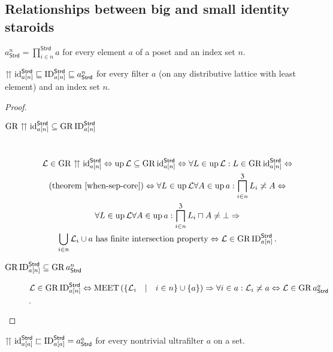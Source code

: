 \subsection{Relationships between big and small identity staroids}
\begin{defn}
$a_{\mathsf{Strd}}^{n}=\prod_{i\in n}^{\mathsf{Strd}}a$ for every
element $a$ of a poset and an index set $n$.\end{defn}
\begin{prop}
$\upuparrows\operatorname{id}_{a[n]}^{\mathsf{Strd}}\sqsubseteq\operatorname{ID}_{a[n]}^{\mathsf{Strd}}\sqsubseteq a_{\mathsf{Strd}}^{n}$
for every filter $a$ (on any distributive lattice with least element) and an index set
$n$.\end{prop}
\begin{proof}
~
\begin{description}
\item [{$\operatorname{GR}\upuparrows\operatorname{id}_{a[n]}^{\mathsf{Strd}}\subseteq\operatorname{GR}\operatorname{ID}_{a[n]}^{\mathsf{Strd}}$}] ~
\begin{multline*}
\mathcal{L}\in\operatorname{GR}\upuparrows\operatorname{id}_{a[n]}^{\mathsf{Strd}}\Leftrightarrow\operatorname{up}\mathcal{L}\subseteq\operatorname{GR}\operatorname{id}_{a[n]}^{\mathsf{Strd}}\Leftrightarrow\forall L\in\operatorname{up}\mathcal{L}:L\in\operatorname{GR}\operatorname{id}_{a[n]}^{\mathsf{Strd}}\Leftrightarrow\\
\text{(theorem~\ref{when-sep-core})}\Leftrightarrow\forall L\in\operatorname{up}\mathcal{L}\forall A\in\operatorname{up} a:\bigsqcap_{i\in n}^{\mathfrak{Z}}L_{i}\not\asymp A\Leftrightarrow\\
\forall L\in\operatorname{up}\mathcal{L}\forall A\in\operatorname{up} a:\bigsqcap_{i\in n}^{\mathfrak{Z}}L_{i}\sqcap A\neq\bot\Rightarrow\\
\bigcup_{i\in n}\mathcal{L}_{i}\cup a\text{ has finite intersection property}\Leftrightarrow\mathcal{L}\in\operatorname{GR}\operatorname{ID}_{a[n]}^{\mathsf{Strd}}.
\end{multline*}

\item [{$\operatorname{GR}\operatorname{ID}_{a[n]}^{\mathsf{Strd}}\subseteq\operatorname{GR} a_{\mathsf{Strd}}^{n}$}] $\mathcal{L}\in\operatorname{GR}\operatorname{ID}_{a[n]}^{\mathsf{Strd}}\Leftrightarrow\operatorname{MEET}\left(\left\{ \mathcal{L}_{i}\hspace{1em}|\hspace{1em}i\in n\right\} \cup\{a\}\right)\Rightarrow\forall i\in a:\mathcal{L}_{i}\not\asymp a\Leftrightarrow\mathcal{L}\in\operatorname{GR} a_{\mathsf{Strd}}^{a}$.
\end{description}
\end{proof}
\begin{prop}
$\upuparrows\operatorname{id}_{a[a]}^{\mathsf{Strd}}\sqsubset\operatorname{ID}_{a[a]}^{\mathsf{Strd}}=a_{\mathsf{Strd}}^{a}$
for every nontrivial ultrafilter $a$ on a set.\end{prop}
